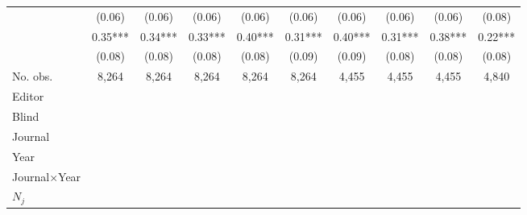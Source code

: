 \begin{table}
\begin{threeparttable}
\begin{tabular}{p{3cm}S@{}S@{}S@{}S@{}S@{}S@{}S@{}S@{}S@{}}
                                          &      (0.06)   &      (0.06)   &      (0.06)   &      (0.06)   &      (0.06)   &      (0.06)   &      (0.06)   &      (0.06)   &      (0.08)   \\
            &        0.35***&        0.34***&        0.33***&        0.40***&        0.31***&        0.40***&        0.31***&        0.38***&        0.22***\\
                                          &      (0.08)   &      (0.08)   &      (0.08)   &      (0.08)   &      (0.09)   &      (0.09)   &      (0.08)   &      (0.08)   &      (0.08)   \\
            \midrule
            No. obs.                      &       8,264   &       8,264   &       8,264   &       8,264   &       8,264   &       4,455   &       4,455   &       4,455   &       4,840   \\
            \midrule
            Editor                &           {}   &           {}   &           {}   &           {}   &           {}   &           {}   &           {}   &           {}   &           {}   \\
            Blind                         &           {}   &           {}   &           {}   &           {}   &           {}   &           {}   &           {}   &           {}   &           {}   \\
            Journal                       &           {}   &           {}   &               &               &               &               &               &               &               \\
            Year                          &               &           {}   &               &               &               &               &               &               &               \\
            Journal\(\times\)Year                  &               &               &           {}   &           {}   &           {}   &           {}   &           {}   &           {}   &           {}   \\
            \(N_j\)                       &               &               &               &           {}   &           {}   &           {}   &           {}   &           {}   &           {}   \\

\end{tabular}
\end{threeparttable}
\end{table}
